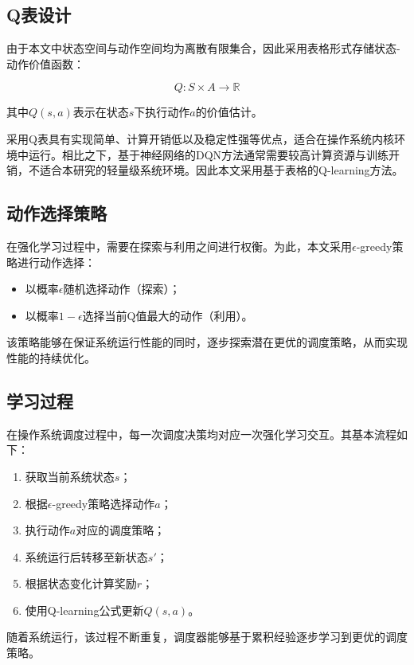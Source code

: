 \subsection{Q表设计}

由于本文中状态空间与动作空间均为离散有限集合，因此采用表格形式存储状态-动作价值函数：

$$
Q: S \times A \rightarrow \mathbb{R}
$$

其中$Q(s,a)$表示在状态$s$下执行动作$a$的价值估计。

采用Q表具有实现简单、计算开销低以及稳定性强等优点，适合在操作系统内核环境中运行。相比之下，基于神经网络的DQN方法通常需要较高计算资源与训练开销，不适合本研究的轻量级系统环境。因此本文采用基于表格的Q-learning方法。

\subsection{动作选择策略}

在强化学习过程中，需要在探索与利用之间进行权衡。为此，本文采用$\epsilon$-greedy策略进行动作选择：

\begin{itemize}
\item 以概率$\epsilon$随机选择动作（探索）；
\item 以概率$1-\epsilon$选择当前Q值最大的动作（利用）。
\end{itemize}

该策略能够在保证系统运行性能的同时，逐步探索潜在更优的调度策略，从而实现性能的持续优化。

\subsection{学习过程}

在操作系统调度过程中，每一次调度决策均对应一次强化学习交互。其基本流程如下：

\begin{enumerate}
\item 获取当前系统状态$s$；
\item 根据$\epsilon$-greedy策略选择动作$a$；
\item 执行动作$a$对应的调度策略；
\item 系统运行后转移至新状态$s'$；
\item 根据状态变化计算奖励$r$；
\item 使用Q-learning公式更新$Q(s,a)$。
\end{enumerate}

随着系统运行，该过程不断重复，调度器能够基于累积经验逐步学习到更优的调度策略。

